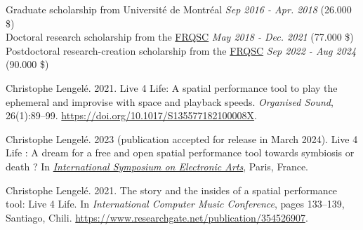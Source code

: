 \documentclass[10pt,a4paper]{article}
\begin{document}
\spacedhrule{1em}{-0.4em}

\bodytext
  {Graduate scholarship from Université de Montréal \hspace{8.8em} 		\textit{Sep 2016 - Apr. 2018} \hspace{2em} (26.000 \$) 
  \\Doctoral research scholarship from the {\href{https://frq.gouv.qc.ca/en/society-and-culture/}{FRQSC}} \hspace{10.5em}			\textit{May 2018 - Dec. 2021} \hspace{1.5em} (77.000 \$)
  \\Postdoctoral research-creation scholarship from the {\href{https://frq.gouv.qc.ca/en/society-and-culture/}{FRQSC}} \hspace{4.8em} 	\textit{Sep 2022 - Aug 2024} \hspace{2.5em} (90.000 \$)}

\vspace{-0.2em}  


\spacedhrule{1em}{-0.4em}

\vspace{0.4em}  

\noindent Christophe Lengelé. 2021. Live 4 Life: A spatial performance tool to play the ephemeral and improvise with space and playback speeds. \textit{Organised Sound}, 26(1):89–99. {\href{https://doi.org/10.1017/S135577182100008X}{https://doi.org/10.1017/S135577182100008X}}.

\spacedhrule{1em}{-0.4em}

\vspace{0.4em}  

\noindent Christophe Lengelé. 2023 (publication accepted for release in March 2024). Live 4 Life : A dream for a free and open spatial performance tool towards symbiosis or death ?
In \textit{\href{https://isea2023.isea-international.org/en/accueil}{International Symposium on Electronic Arts}}, Paris, France.

\vspace{0.6em} 

 \noindent Christophe Lengelé. 2021. The story and the insides of a spatial performance tool: Live 4 Life. In \textit{International Computer Music Conference}, pages 133–139, Santiago, Chili. {\href{https://www.researchgate.net/publication/354526907}{https://www.researchgate.net/publication/354526907}}.
\end{document}
